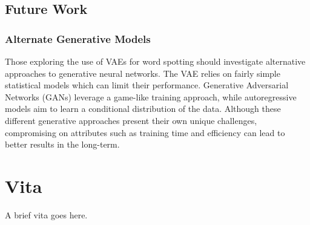 \documentclass[final]{ukthesis}
\begin{document}
\section{Future Work}
\subsection{Alternate Generative Models} 
Those exploring the use of VAEs for word spotting should investigate alternative approaches to generative neural networks. The VAE relies on fairly simple statistical models which can limit their performance. Generative Adversarial Networks (GANs) \cite{goodfellow2014generative} leverage a game-like training approach, while autoregressive models \cite{oord2016pixel} aim to learn a conditional distribution of the data. Although these different generative approaches present their own unique challenges, compromising on attributes such as training time and efficiency can lead to better results in the long-term.



\copyrightnotice
\backmatter

\chapter{Vita}
A brief vita goes here.
\end{document}
